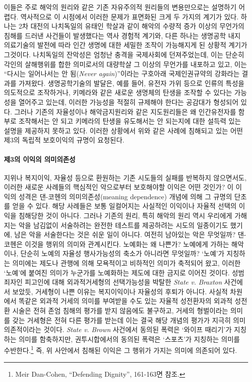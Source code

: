 이들은 주로 해악의 원리와 같은 기존 자유주의적 원리들의 변용만으로는 설명하기 어렵다. 역사적으로 이 시점에서 이러한 문제가 표면화된 크게 두 가지의 계기가 있다. 하나는 2차 대전의 나치독일의 유태인 학살과 같이 해악의 수량적 증가 이상의 무언가의 침해를 드러낸 사건들이 발생했다는 역사 경험적 계기와, 다른 하나는 생명공학 내지 의료기술의 발전에 따라 인간 생명에 대한 세밀한 조작이 가능해지게 된 상황적 계기가 그것이다. 나치독일의 잔악성은 엄청난 충격을 국제사회에 던져주었는데, 이는 단순히 각인의 살해행위를 합한 의미로서의 대량학살 그 이상의 무언가를 내포하고 있고, 이는 ``다시는 일어나서는 안 됨(\emph{Never again})''이라는 구호아래 국제인권규약의 강화라는 결과를 가져왔다. 생명공학기술의 발달은, 예를 들어, 유전자 가위 등으로 인류의 특성을 의도적으로 조작하거나, 키메라와 같은 새로운 생명체의 탄생을 조작할 수 있다는 가능성을 열어주고 있는데, 이러한 가능성을 적절히 규제해야 한다는 공감대가 형성되어 있다. 그러나 기존의 자율성이나 해악금지원리와 같은 지도원리들은 왜 인간유전자를 함부로 조작해서는 안 되고 키메라의 탄생을 유도해서는 안 되는지에 대한 설득력 있는 설명을 제공하지 못하고 있다. 이러한 상황에서 위와 같은 사례에 침해되고 있는 어떤 제3의 독립적 보호이익의 규명이 요청된다.

\paragraph{제3의 이익의 의미의존성}

지위나 복지이익, 자율성 등으로 환원하는 기존 시도들의 실패를 반복하지 않으면서도, 이러한 새로운 사례들의 핵심적인 악으로부터 보호해야할 이익은 어떤 것인가? 이 이익의 성격은 댄-코헨의 의미의존성(meaning dependence) 개념에 의해 그 규명의 단초를 얻을 수 있다. 해당 사례들은 보통 일컬어지는 사실적인 이익이나 자율적 선택의 이익을 침해당한 것이 아니다. 그러나 기존의 원리, 특히 해악의 원리 역시 우리에게 가해지는 악을 남김없이 서술하려는 완전한 테스트를 제공하려는 시도의 일종이기도 했기에, 남은 악을 서술한다는 것은 쉬운 일이 아니다. 여전히 남아있는 악은 무엇일까? 댄-코헨은 이것을 행위의 의미와 관계시킨다. 노예화는 왜 나쁜가? 노예에게 가하는 해악이나, 단순히 노예의 자율성 행사가능성의 축소가 아니라면 무엇일까? `노예'가 지칭하는 의미에는 제도나 관행에 의해 모욕적이고 비하적인 의미가 축적되어 왔고, 이러한 `노예'에 붙여진 의미가 누군가를 노예화하는 제도에 대한 금지로 이어진 것이다. 성범죄자인 피고인에 대해 외과적거세형의 선택가능성을 박탈한 \emph{State v. Braxton} 사건에서 보았듯, 거세형이 나쁜 이유는 복지이익이나 자율성의 후퇴가 아니다. 사실적 차원에서 똑같은 외과적 거세의 의미를 부여받을 수도 있는 자율적 성전환자의 외과적 성전환 시술은 전혀 존엄 침해의 평가를 받지 않음에도 불구하고, 거세의 형벌이라는 의미를 갖는 거세형은 전혀 다른 평가를 받는데 이는 결국 해당 개념의 평가가 지극히 의미의존적이라는 것이다. \emph{State v. Brown} 사건에서 동의된 폭력은 `와이프 때리기'가 지칭하는 의미를 함축하지만, 권투시합에서의 동의된 폭력은 `스포츠'가 지칭하는 의미를 수반한다.\footnote{Meir Dan-Cohen, ``Defending Dignity'', 161-163면 참조.} 즉, 위 사안에서 침해된 이익은 그 행위가 가지는 의미에 의존되어 있다.


